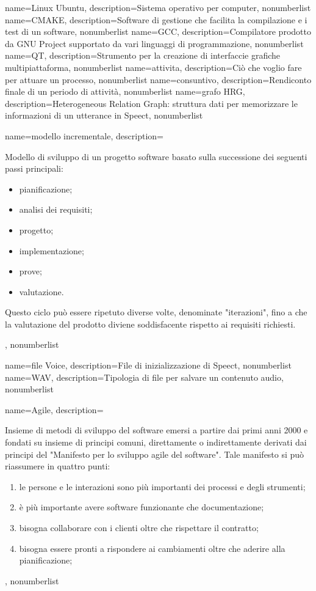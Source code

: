 {
	name={Linux Ubuntu},
	description={Sistema operativo per computer},
	nonumberlist
}
{
	name={CMAKE},
	description={Software di gestione che facilita la compilazione e i test di un software},
	nonumberlist
}
{
	name={GCC},
	description={Compilatore prodotto da GNU Project supportato da vari linguaggi di programmazione},
	nonumberlist
}
{
	name={QT},
	description={Strumento per la creazione di interfaccie grafiche multipiattaforma},
	nonumberlist
}
{
	name={attivita},
	description={Ciò che voglio fare per attuare un processo},
	nonumberlist
}
{
	name={consuntivo},
	description={Rendiconto finale di un periodo di attività},
	nonumberlist
}
{
	name={grafo HRG},
	description={Heterogeneous Relation Graph: struttura dati per memorizzare le informazioni di un utterance in Speect},
	nonumberlist
}
{
	name={modello incrementale},
	description={Modello di sviluppo di un progetto software basato sulla successione dei seguenti passi principali:
	\begin{itemize}
    	\item pianificazione;
    	\item analisi dei requisiti;
   		\item progetto;
   		\item implementazione;
   		\item prove;
   		\item valutazione.
	\end{itemize}
	Questo ciclo può essere ripetuto diverse volte, denominate "iterazioni", fino a che la valutazione del prodotto diviene soddisfacente rispetto ai requisiti richiesti.},
	nonumberlist
}
{
	name={file Voice},
	description={File di inizializzazione di Speect},
	nonumberlist
}
{
	name={WAV},
	description={Tipologia di file per salvare un contenuto audio},
	nonumberlist
}
{
	name={Agile},
	description={Insieme di metodi di sviluppo del software emersi a partire dai
		primi anni 2000 e fondati su insieme di principi comuni, direttamente o
		indirettamente derivati dai principi del "Manifesto per lo sviluppo agile del
		software". Tale manifesto si può riassumere in quattro punti:
		\begin{enumerate}
			\item le persone e le interazioni sono più importanti dei processi e degli strumenti;
			\item è più importante avere software funzionante che documentazione;
			\item bisogna collaborare con i clienti oltre che rispettare il contratto;
			\item bisogna essere pronti a rispondere ai cambiamenti oltre che aderire alla pianificazione;
		\end{enumerate}
	},
	nonumberlist
}
